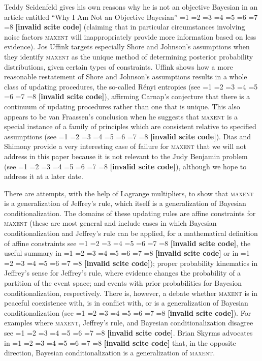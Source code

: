 \documentclass[12pt]{article}
\newcommand{\qeins}[1]{``#1''}
\newif\ifNumericalOrYear
\newcommand{\PageP}{p.~}
\newcommand{\PageP}{}
\newcommand{\scite}[3]{\ifnum#1=1\ifNumericalOrYear\citep{#2}\else\citeyearpar{#2}\fi\else
\ifnum#1=2\ifNumericalOrYear\citep[#3]{#2}\else\citep[{\PageP}#3]{#2}\fi\else
\ifnum#1=3\ifNumericalOrYear(\citet[#3]{#2})\else\citep[{\PageP}#3]{#2}\fi\else
\ifnum#1=4\ifNumericalOrYear\citet{#2}\else\citet{#2}\fi\else
\ifnum#1=5\ifNumericalOrYear(\citet{#2})\else\citep{#2}\fi\else
\ifnum#1=6\ifNumericalOrYear(\citet[#3]{#2})\else\citep[{\PageP}#3]{#2}\fi\else
\ifnum#1=7\ifNumericalOrYear\citep{#2}\else\citealp{#2}\fi\else
\ifnum#1=8\ifNumericalOrYear\citep[#3]{#2}\else\citealp[{\PageP}#3]{#2}\fi\else
\textbf{[invalid scite code]}\fi\fi\fi\fi\fi\fi\fi\fi}
\begin{document}
Teddy Seidenfeld gives his own reasons why he is not an objective
Bayesian in an article entitled \qeins{Why I Am Not an Objective
  Bayesian} \scite{1}{seidenfeld79}{} (claiming that in particular
circumstances involving noise factors \textsc{maxent} will
inappropriately provide more information based on less evidence). Jos
Uffink targets especially Shore and Johnson's assumptions when they
identify \textsc{maxent} as the unique method of determining posterior
probability distributions, given certain types of constraints. Uffink
shows how a more reasonable restatement of Shore and Johnson's
assumptions results in a whole class of updating procedures, the
so-called R{\'e}nyi entropies (see \scite{7}{uffink95}{}), affirming
Carnap's conjecture that there is a continuum of updating procedures
rather than one that is unique. This also appears to be van Fraassen's
conclusion when he suggests that \textsc{maxent} is a special instance
of a family of principles which are consistent relative to specified
assumptions (see \scite{7}{fraassenetal86}{}). Dias and Shimony
provide a very interesting case of failure for \textsc{maxent} that we
will not address in this paper because it is not relevant to the
Judy Benjamin problem (see \scite{7}{diasshimony81}{}), although we
hope to address it at a later date.

There are attempts, with the help of Lagrange multipliers, to show
that \textsc{maxent} is a generalization of Jeffrey's rule, which
itself is a generalization of Bayesian conditionalization. The domains
of these updating rules are affine constraints for \textsc{maxent}
(these are most general and include cases in which Bayesian
conditionalization and Jeffrey's rule can be applied, for a
mathematical definition of affine constraints see
\scite{7}{csiszar67}{}, the useful summary in
\scite{8}{howsonfranklin94}{456} or in \scite{8}{williams80}{136ff});
proper probability kinematics in Jeffrey's sense for Jeffrey's rule,
where evidence changes the probability of a partition of the event
space; and events with prior probabilities for Bayesion
conditionalization, respectively. There is, however, a debate whether
\textsc{maxent} is in peaceful coexistence with, is in conflict with,
or is a generalization of Bayesian conditionalization (see
\scite{7}{uffink96}{}). For examples where \textsc{maxent}, Jeffrey's
rule, and Bayesian conditionalization disagree see
\scite{7}{williamson09}{}. Brian Skyrms advocates in
\scite{1}{skyrms85}{} that, in the opposite direction, Bayesian
conditionalization is a generalization of \textsc{maxent}.
\end{document}
